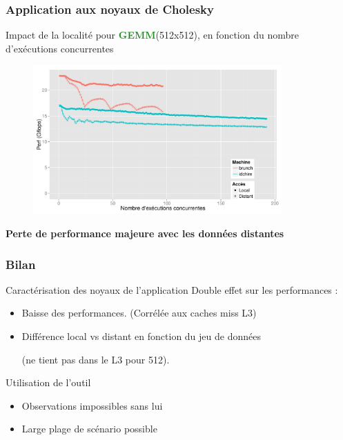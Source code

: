 \documentclass[xcolor={usenames,dvipsnames,svgnames,table}, aspectratio=43]{beamer}
\newcommand{\gemmcolor}[1]{\textcolor{ForestGreen}{\textbf{#1}}\xspace}
\newcommand{\gemm}{\gemmcolor{GEMM}}
\begin{document}
\begin{frame}
\frametitle{Application aux noyaux de Cholesky}

Impact de la localité pour \gemm (512x512), en fonction du nombre d'exécutions concurrentes

\begin{figure}
  \centering
  \includegraphics[width=0.85\textwidth]{graph/kernel_comp_locality_gemm_512.pdf}
\end{figure}

\textbf{Perte de performance majeure avec les données distantes}

\end{frame}


\begin{frame}
  \frametitle{Bilan}
  \begin{block}{Caractérisation des noyaux de l'application}
    Double effet sur les performances :
    \begin{itemize}
      \item Baisse des performances. (Corrélée aux caches miss L3)
      \item Différence local vs distant en fonction du jeu de données

	(ne tient pas dans le L3 pour 512).
    \end{itemize}
  \end{block}

  \begin{block}{Utilisation de l'outil}
    \begin{itemize}
      \item Observations impossibles sans lui
      \item Large plage de scénario possible
    \end{itemize}
  \end{block}


\end{frame}
\end{document}
